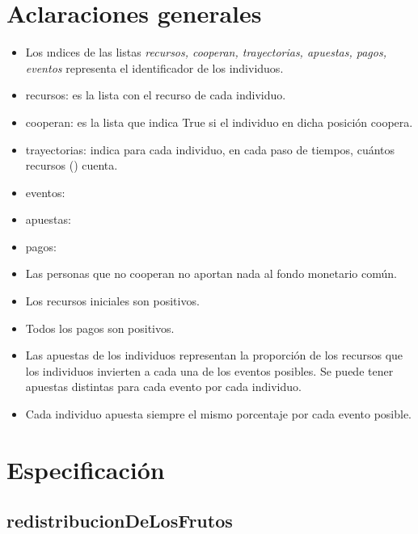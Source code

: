 \documentclass[10pt,a4paper]{article}
\begin{document}
\maketitle
\section{Aclaraciones generales}

\begin{itemize}
	\item Los ındices de las listas \textit{recursos, cooperan, trayectorias, apuestas, pagos, eventos} representa el identificador de los individuos.
	\item recursos: {\TLista{\float}} es la lista con el recurso de cada individuo.
 	\item cooperan:  {\TLista{\bool}} es la lista que indica True si el individuo en dicha posici\'on coopera.
        \item trayectorias: \TLista{\float} indica para cada individuo, en cada paso de tiempos, cu\'antos recursos (\float) cuenta.
        \item eventos:
        \item apuestas: 
        \item pagos: 
        \item Las personas que no cooperan no aportan nada al fondo monetario com\'un.
        \item Los recursos iniciales son positivos.
        \item Todos los pagos son positivos.
        \item Las apuestas de los individuos representan la proporci\'on de los recursos que los individuos invierten a cada una de los eventos posibles. Se puede tener apuestas
distintas para cada evento por cada individuo.
        \item Cada individuo apuesta siempre el mismo porcentaje por cada evento posible.

\end{itemize}
\section{Especificaci\'on}
\subsection{redistribucionDeLosFrutos}

\end{document}
